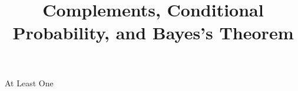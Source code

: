 \documentclass{beamer}
\title[MA205 - Section 4.3]{Complements, Conditional Probability, and Bayes's Theorem}
\begin{document}
\begin{frame}
\titlepage
\end{frame}

\begin{frame}
\begin{block}{At Least One}

\end{block}
\end{frame}
\end{document}
